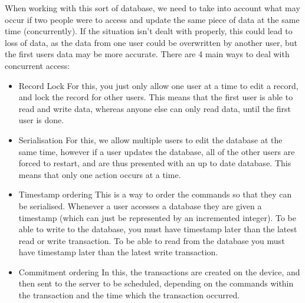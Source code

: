 When working with this sort of database, we need to take into account what may occur if two people were to access and update the same piece of data at the same time (concurrently). If the situation isn't dealt with properly, this could lead to loss of data, as the data from one user could be overwritten by another user, but the first users data may be more accurate. There are 4 main ways to deal with concurrent access:
\begin{itemize}
	\item Record Lock
		\subitem For this, you just only allow one user at a time to edit a record, and lock the record for other users.  This means that the first user is able to read and write data, whereas anyone else can only read data, until the first user is done.
	\item Serialisation
		\subitem For this, we allow multiple users to edit the database at the same time, however if a user updates the database, all of the other users are forced to restart, and are thus presented with an up to date database. This means that only one action occurs at a time.
	\item Timestamp ordering
		\subitem This is a way to order the commands so that they can be serialised. Whenever a user accesses a database they are given a timestamp (which can just be represented by an incremented integer). To be able to write to the database, you must have timestamp later than the latest read or write transaction. To be able to read from the database you must have timestamp later than the latest write transaction.
	\item Commitment ordering
		\subitem In this, the transactions are created on the device, and then sent to the server to be scheduled, depending on the commands within the transaction and the time which the transaction occurred.
\end{itemize}